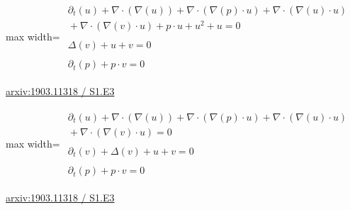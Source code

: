 \documentclass[UTF8,10pt,a4paper,fontset=mac]{ctexart}
\begin{document}
\begin{minipage}{\linewidth}\begin{center}\begin{adjustbox}{max width=\linewidth}$\displaystyle\begin{gathered}\begin{gathered}\partial_{t}(u)+\nabla\cdot(\nabla(u))+\nabla\cdot(\nabla(p)\cdot u)+\nabla\cdot(\nabla(u)\cdot u)\\[-1pt]{}+\nabla\cdot(\nabla(v)\cdot u)+p\cdot u+u^{2}+u=0\end{gathered}\\[5pt]\begin{gathered}\Delta(v)+u+v=0\end{gathered}\\[5pt]\begin{gathered}\partial_{t}(p)+p\cdot v=0\end{gathered}\end{gathered}$\end{adjustbox}\end{center}{\small\href{https://arxiv.org/html/1903.11318#S1.E3}{arxiv:1903.11318 / S1.E3}}\par\end{minipage}\par\vspace{6mm}

\begin{minipage}{\linewidth}\begin{center}\begin{adjustbox}{max width=\linewidth}$\displaystyle\begin{gathered}\begin{gathered}\partial_{t}(u)+\nabla\cdot(\nabla(u))+\nabla\cdot(\nabla(p)\cdot u)+\nabla\cdot(\nabla(u)\cdot u)\\[-1pt]{}+\nabla\cdot(\nabla(v)\cdot u)=0\end{gathered}\\[5pt]\begin{gathered}\partial_{t}(v)+\Delta(v)+u+v=0\end{gathered}\\[5pt]\begin{gathered}\partial_{t}(p)+p\cdot v=0\end{gathered}\end{gathered}$\end{adjustbox}\end{center}{\small\href{https://arxiv.org/html/1903.11318#S1.E3}{arxiv:1903.11318 / S1.E3}}\par\end{minipage}\par\vspace{6mm}
\end{document}

